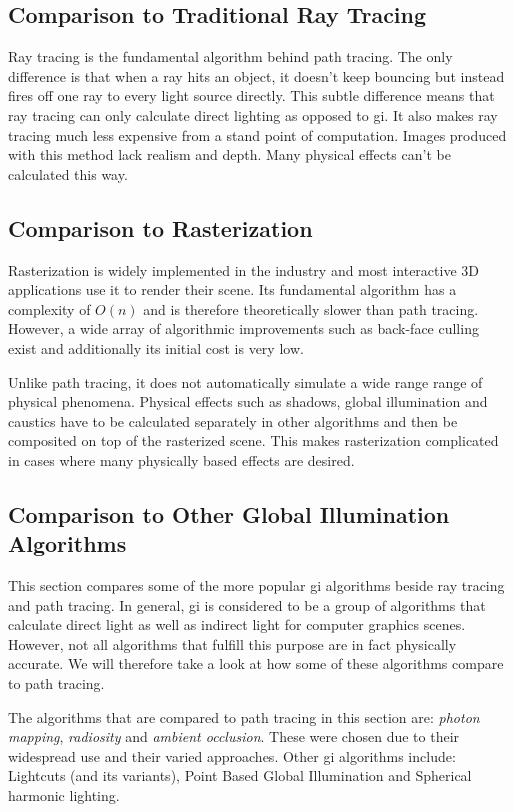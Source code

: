 \documentclass[
  twoside,
  11pt, a4paper,
  footinclude=true,
  headinclude=true,
  cleardoublepage=empty
]{scrreprt}
\begin{document}
\subsection{Comparison to Traditional Ray Tracing}
Ray tracing is the fundamental algorithm behind path tracing. The only difference is that when a
ray hits an object, it doesn't keep bouncing but instead fires off one ray to every light source
directly. This subtle difference means that ray tracing can only calculate direct lighting as
opposed to \ac{gi}. It also makes ray tracing much less expensive from a stand point of
computation. Images produced with this method lack realism and depth. Many physical effects can't
be calculated this way.

\subsection{Comparison to Rasterization}
Rasterization is widely implemented in the industry and most interactive 3D applications use it to
render their scene. Its fundamental algorithm has a complexity of \(O(n)\) and is therefore
theoretically slower than path tracing. However, a wide array of algorithmic improvements such as
back-face culling exist and additionally its initial cost is very low.

Unlike path tracing, it does not automatically simulate a wide range range of physical phenomena.
Physical effects such as shadows, global illumination and caustics have to be calculated separately
in other algorithms and then be composited on top of the rasterized scene. This makes rasterization
complicated in cases where many physically based effects are desired.

\subsection{Comparison to Other Global Illumination Algorithms}
This section compares some of the more popular \ac{gi} algorithms beside ray tracing and
path tracing. In general, \ac{gi} is considered to be a group of algorithms that calculate
direct light as well as indirect light for computer graphics scenes. However, not all algorithms
that fulfill this purpose are in fact physically accurate. We will therefore take a look at how
some of these algorithms compare to path tracing.

The algorithms that are compared to path tracing in this section are: \emph{photon mapping},
\emph{radiosity} and
\emph{ambient occlusion}. These were chosen due to their widespread use and their varied approaches.
Other \ac{gi} algorithms include: Lightcuts (and its variants), Point Based Global Illumination
and Spherical harmonic lighting.
\end{document}
